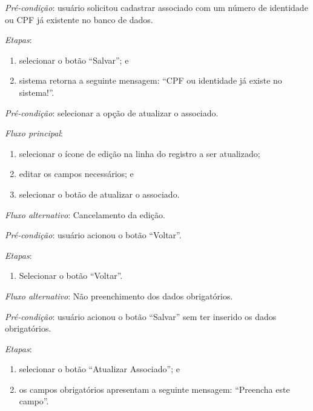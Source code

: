 \noindent \textit{Pré-condição}: usuário solicitou cadastrar associado com um número de identidade ou CPF já existente no banco de dados.

\noindent \textit{Etapas}:

\begin{enumerate}
    \item selecionar o botão ``Salvar''; e
    \item sistema retorna a seguinte mensagem: ``CPF ou identidade já existe no sistema!''.
\end{enumerate}


\vspace{0.7cm}

\noindent \textit{Pré-condição}: selecionar a opção de atualizar o associado.

\noindent \textit{Fluxo principal}:

\begin{enumerate}
    \item selecionar o ícone de edição na linha do registro a ser atualizado;
    \item editar os campos necessários; e
    \item selecionar o botão de atualizar o associado.
\end{enumerate}

\noindent \textit{Fluxo alternativo}: Cancelamento da edição.

\noindent \textit{Pré-condição}: usuário acionou o botão ``Voltar''.

\noindent \textit{Etapas}:

\begin{enumerate}
    \item Selecionar o botão ``Voltar''.
\end{enumerate}

\noindent \textit{Fluxo alternativo}: Não preenchimento dos dados obrigatórios.

\noindent \textit{Pré-condição}: usuário acionou o botão ``Salvar'' sem ter inserido os dados obrigatórios.

\noindent \textit{Etapas}:

\begin{enumerate}
    \item selecionar o botão ``Atualizar Associado''; e
    \item os campos obrigatórios apresentam a seguinte mensagem: ``Preencha este campo''.
\end{enumerate}


